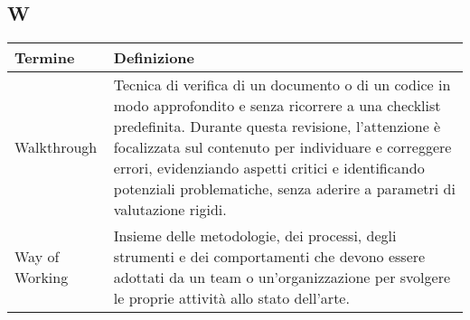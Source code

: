 \documentclass[10pt]{article}
\begin{document}
\subsection{W} %
\begin{longtable}{|>{\centering\arraybackslash}m{2.5cm}|>{\arraybackslash}m{12.5cm}|}
\hline
\rowcolor[gray]{0.8}
\textbf{Termine} & \textbf{Definizione}\\
\endhead
\hline
Walkthrough & Tecnica di verifica di un documento o di un codice in modo approfondito e senza ricorrere a una checklist predefinita. Durante questa revisione, l'attenzione è focalizzata sul contenuto per individuare e correggere errori, evidenziando aspetti critici e identificando potenziali problematiche, senza aderire a parametri di valutazione rigidi.\\
\hline
Way of Working & Insieme delle metodologie, dei processi, degli strumenti e dei comportamenti che devono essere adottati da un team o un'organizzazione per svolgere le proprie attività allo stato dell'arte.\\
\hline
\end{longtable}



\end{document}
